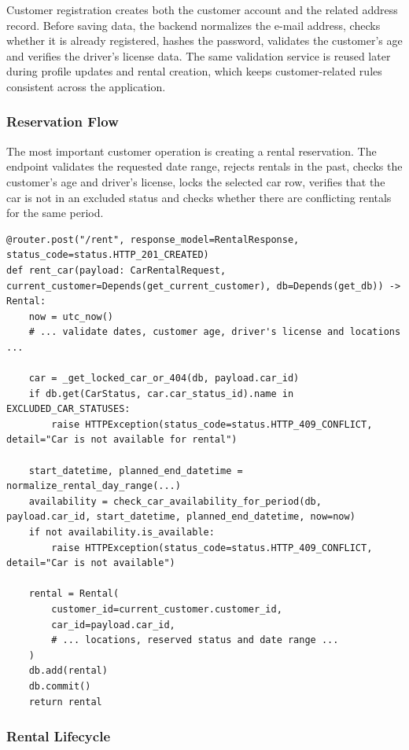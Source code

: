 Customer registration creates both the customer account and the related address record. Before saving data, the backend normalizes the e-mail address, checks whether it is already registered, hashes the password, validates the customer's age and verifies the driver's license data. The same validation service is reused later during profile updates and rental creation, which keeps customer-related rules consistent across the application.

\subsubsection{Reservation Flow}

The most important customer operation is creating a rental reservation. The endpoint validates the requested date range, rejects rentals in the past, checks the customer's age and driver's license, locks the selected car row, verifies that the car is not in an excluded status and checks whether there are conflicting rentals for the same period.

\begin{lstlisting}[style=pythonstyle,caption={Creating a rental reservation},label={lst:backend-rent-short}]
@router.post("/rent", response_model=RentalResponse, status_code=status.HTTP_201_CREATED)
def rent_car(payload: CarRentalRequest, current_customer=Depends(get_current_customer), db=Depends(get_db)) -> Rental:
    now = utc_now()
    # ... validate dates, customer age, driver's license and locations ...

    car = _get_locked_car_or_404(db, payload.car_id)
    if db.get(CarStatus, car.car_status_id).name in EXCLUDED_CAR_STATUSES:
        raise HTTPException(status_code=status.HTTP_409_CONFLICT, detail="Car is not available for rental")

    start_datetime, planned_end_datetime = normalize_rental_day_range(...)
    availability = check_car_availability_for_period(db, payload.car_id, start_datetime, planned_end_datetime, now=now)
    if not availability.is_available:
        raise HTTPException(status_code=status.HTTP_409_CONFLICT, detail="Car is not available")

    rental = Rental(
        customer_id=current_customer.customer_id,
        car_id=payload.car_id,
        # ... locations, reserved status and date range ...
    )
    db.add(rental)
    db.commit()
    return rental
\end{lstlisting}

\subsubsection{Rental Lifecycle}


